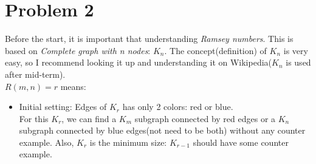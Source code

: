 \section*{Problem 2}
	Before the start, it is important that understanding \textit{Ramsey numbers}. This is based on \textit{Complete graph with n nodes}: $K_n$. The concept(definition) of $K_n$ is very easy, so I recommend looking it up and understanding it on Wikipedia($K_n$ is used after mid-term).\\
	$R(m, n) = r$ means:
	\begin{itemize}
		\item [] Initial setting: Edges of $K_r$ has only 2 colors: red or blue.\\
		For this $K_r$, we can find a $K_m$ subgraph connected by red edges or a $K_n$ subgraph connected by blue edges(not need to be both) without any counter example. Also, $K_r$ is the minimum size: $K_{r - 1}$ should have some counter example.
	\end{itemize}
